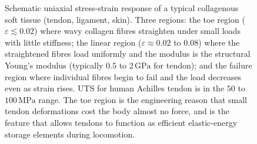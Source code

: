 \begin{figure}[htbp]
\begin{tikzpicture}[
  axis/.style={-{Stealth}, thick, draw=engblack},
  curve/.style={very thick, engred},
  region/.style={draw=none, opacity=0.15},
  annot/.style={font=\scriptsize, align=center},
]
\end{tikzpicture}
\caption{Schematic uniaxial stress-strain response of a typical
collagenous soft tissue (tendon, ligament, skin). Three regions: the
toe region ($\varepsilon \lesssim 0.02$) where wavy collagen fibres
straighten under small loads with little stiffness; the linear region
($\varepsilon \approx 0.02$ to $0.08$) where the straightened fibres
load uniformly and the modulus is the structural Young's modulus
(typically $0.5$ to $2\,\text{GPa}$ for tendon); and the failure
region where individual fibres begin to fail and the load decreases
even as strain rises. UTS for human Achilles tendon is in the
$50$ to $100\,\text{MPa}$ range. The toe region is the engineering
reason that small tendon deformations cost the body almost no force,
and is the feature that allows tendons to function as efficient
elastic-energy storage elements during locomotion.}
\label{fig:vol06ch06:soft-stress-strain}
\end{figure}
